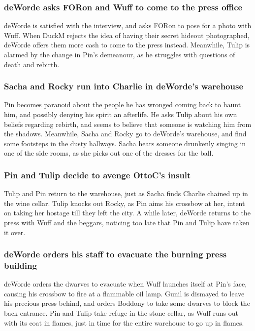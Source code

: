 \subsubsection{\Gls{deWorde} asks \Gls{FORon} and \Gls{Wuff} to come to the press office}
\Gls{deWorde} is satisfied with the interview, and asks \Gls{FORon} to pose for a photo with
\Gls{Wuff}. When \Gls{DuckM} rejects the idea of having their secret hideout photographed,
\Gls{deWorde} offers them more cash to come to the press instead. Meanwhile, \Gls{Tulip} is alarmed
by the change in \Gls{Pin}'s demeanour, as he struggles with questions of death and rebirth.

\subsubsection{\Gls{Sacha} and \Gls{Rocky} run into \Gls{Charlie} in \Gls{deWorde}'s warehouse}
\Gls{Pin} becomes paranoid about the people he has wronged coming back to haunt him, and possibly
denying his spirit an afterlife. He asks \Gls{Tulip} about his own beliefs regarding rebirth, and
seems to believe that someone is watching him from the shadows. Meanwhile, \Gls{Sacha} and
\Gls{Rocky} go to \Gls{deWorde}'s warehouse, and find some footsteps in the dusty hallways.
\Gls{Sacha} hears someone drunkenly singing in one of the side rooms, as she picks out one of the
dresses for the ball.

\subsubsection{\Gls{Pin} and \Gls{Tulip} decide to avenge \Gls{OttoC}'s insult}
\Gls{Tulip} and \Gls{Pin} return to the warehouse, just as \Gls{Sacha} finds \Gls{Charlie} chained
up in the wine cellar. \Gls{Tulip} knocks out \Gls{Rocky}, as \Gls{Pin} aims his crossbow at her,
intent on taking her hostage till they left the city. A while later, \Gls{deWorde} returns to the
press with \Gls{Wuff} and the beggars, noticing too late that \Gls{Pin} and \Gls{Tulip} have taken
it over.

\subsubsection{\Gls{deWorde} orders his staff to evacuate the burning press building}
\Gls{deWorde} orders the dwarves to evacuate when \Gls{Wuff} launches itself at \Gls{Pin}'s face,
causing his crossbow to fire at a flammable oil lamp. \Gls{Gunil} is dismayed to leave his precious
press behind, and orders \Gls{Boddony} to take some dwarves to block the back entrance. \Gls{Pin}
and \Gls{Tulip} take refuge in the stone cellar, as \Gls{Wuff} runs out with its coat in flames,
just in time for the entire warehouse to go up in flames.

